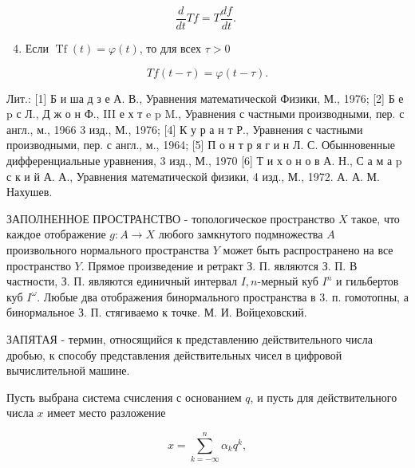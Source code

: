 \documentclass[10pt]{article}
\begin{document}
\[

\frac{d}{d t} T f=T \frac{d f}{d t} \text {. }

\]



\begin{enumerate}

  \setcounter{enumi}{3}

  \item Если $\operatorname{Tf}(t)=\varphi(t)$, то для всех $\tau>0$

\end{enumerate}



\[

T f(t-\tau)=\varphi(t-\tau) .

\]



Лит.: [1] Б и ша д з е А. В., Уравнения математической Физики, М., 1976; [2] Б е p с Л., Д ж о н Ф., III е х т e p M., Уравнения с частными производными, пер. с англ., м., 1966 3 изд., М., 1976; [4] К у р а н т Р., Уравнения с частными производными, пер. с англ., м., 1964; [5] П о н т р я г и н Л. С. Обынновенные дифференциальные уравнения, 3 изд., М., 1970 [6] Т и х о н о в А. Н., С а м а p с к и й А. А., Уравнения математической физики, 4 изд., М., 1972. А. А. М. Нахушев.



ЗАПОЛНЕННОЕ ПРОСТРАНСТВО - топологическое пространство $X$ такое, что каждое отображение $g: A \rightarrow X$ любого замкнутого подмножества $A$ произвольного нормального пространства $Y$ может быть распространено на все пространство $Y$. Прямое произведение и ретракт З. П. являются З. П. В частности, З. П. являются единичный интервал $I, n$-мерный куб $I^{n}$ и гильбертов куб $I^{\omega}$. Любые два отображения бинормального пространства в 3. п. гомотопны, а бинормальное З. П. стягиваемо к точке. М. И. Войцеховский.



ЗАПЯТАЯ - термин, относящийся к представлению действительного числа дробью, к способу представления действительных чисел в цифровой вычислительной машине.



Пусть выбрана система счисления с основанием $q$, и пусть для действительного числа $x$ имеет место разложение



\[

x=\sum_{k=-\infty}^{n} \alpha_{k} q^{k},

\]
\end{document}
